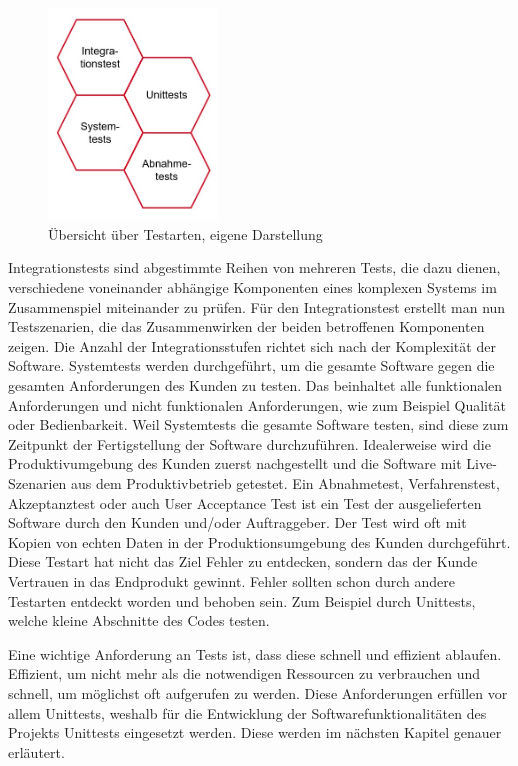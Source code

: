 \documentclass[a4paper,titlepage,halfparskip,12pt]{scrreprt}
\begin{document}
\begin{onehalfspacing}
\begin{figure}[h]
	\centering
	\includegraphics[width=4.5cm]{images/Testarten.png}
	\caption{Übersicht über Testarten, eigene Darstellung}
	\label{img:Testarten}
\end{figure}

Integrationstests sind abgestimmte Reihen von mehreren Tests, die dazu dienen, verschiedene voneinander abhängige Komponenten eines komplexen Systems im Zusammenspiel miteinander zu prüfen. Für den Integrationstest erstellt man nun Testszenarien, die das Zusammenwirken der beiden betroffenen Komponenten zeigen. Die Anzahl der Integrationsstufen richtet sich nach der Komplexität der Software. Systemtests werden durchgeführt, um die gesamte Software gegen die gesamten Anforderungen des Kunden zu testen. Das beinhaltet alle funktionalen Anforderungen und nicht funktionalen Anforderungen, wie zum Beispiel Qualität oder Bedienbarkeit. Weil Systemtests die gesamte Software testen, sind diese zum Zeitpunkt der Fertigstellung der Software durchzuführen. Idealerweise wird die Produktivumgebung des Kunden zuerst nachgestellt und die Software mit Live-Szenarien aus dem Produktivbetrieb getestet. Ein Abnahmetest, Verfahrenstest, Akzeptanztest oder auch User Acceptance Test ist ein Test der ausgelieferten Software durch den Kunden und/oder Auftraggeber. Der Test wird oft mit Kopien von echten Daten in der Produktionsumgebung des Kunden durchgeführt. Diese Testart hat nicht das Ziel Fehler zu entdecken, sondern das der Kunde Vertrauen in das Endprodukt gewinnt. Fehler sollten schon durch andere Testarten entdeckt worden und behoben sein. Zum Beispiel durch Unittests, welche kleine Abschnitte des Codes testen.\cite{witte2019testmanagement}

\smallskip

Eine wichtige Anforderung an Tests ist, dass diese schnell und effizient ablaufen. Effizient, um nicht mehr als die notwendigen Ressourcen zu verbrauchen und schnell, um möglichst oft aufgerufen zu werden.\cite{hubertz2016softwaretests} Diese Anforderungen erfüllen vor allem Unittests, weshalb für die Entwicklung der Softwarefunktionalitäten des Projekts Unittests eingesetzt werden. Diese werden im nächsten Kapitel genauer erläutert.


\end{onehalfspacing}
\end{document}
